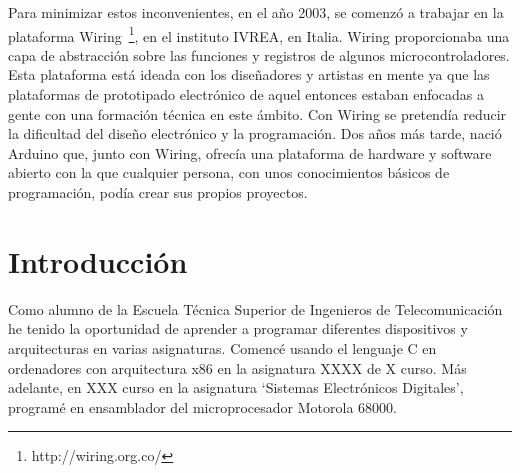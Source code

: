 Para minimizar estos inconvenientes, en el año 2003, se comenzó a trabajar en la plataforma Wiring~\footnote{http://wiring.org.co/},  en el instituto IVREA, en Italia. Wiring proporcionaba una capa de abstracción sobre las funciones y registros de algunos microcontroladores. Esta plataforma está ideada con los diseñadores y artistas en mente ya que las plataformas de prototipado electrónico de aquel entonces estaban enfocadas a gente con una formación técnica en este ámbito. Con Wiring se pretendía reducir la dificultad del diseño electrónico y la programación. Dos años más tarde, nació Arduino que, junto con Wiring, ofrecía una plataforma de hardware y software abierto con la que cualquier persona, con unos conocimientos básicos de programación, podía crear sus propios proyectos.


\section{Introducción}
Como alumno de la Escuela Técnica Superior de Ingenieros de Telecomunicación he tenido la oportunidad de aprender a programar diferentes dispositivos y arquitecturas en varias asignaturas. Comencé usando el lenguaje C en ordenadores con arquitectura x86 en la asignatura XXXX de X curso.  Más adelante, en XXX curso en la asignatura `Sistemas Electrónicos Digitales', programé en ensamblador del microprocesador Motorola 68000.

